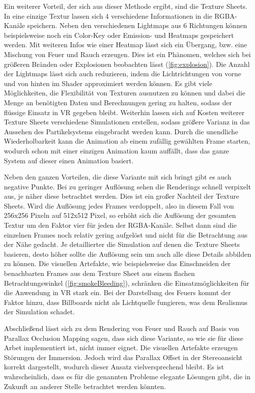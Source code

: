 Ein weiterer Vorteil, der sich aus dieser Methode ergibt, sind die Texture Sheets. In eine einzige Textur lassen sich 4 verschiedene Informationen in die
RGBA-Kanäle speichern. Neben den verschiedenen Lightmaps aus 6 Richtungen können beispielsweise noch ein Color-Key oder Emission- und Heatmaps gespeichert werden.
Mit weiteren Infos wie einer Heatmap lässt sich ein Übergang, bzw. eine Mischung von Feuer und Rauch erzeugen. Dies ist ein Phänomen, welches sich bei größeren Bränden
oder Explosionen beobachten lässt (\autoref{fig:explosion}).
Die Anzahl der Lightmaps lässt sich auch reduzieren, indem die Lichtrichtungen von vorne und von hinten im Shader approximiert werden können.
Es gibt viele Möglichkeiten, die Flexibilität von Texturen ausnutzen zu können und dabei die Menge an benötigten Daten und Berechnungen gering zu halten,
sodass der flüssige Einsatz in VR gegeben bleibt. Weiterhin lassen sich auf Kosten weiterer Texture Sheets
verschiedene Simulationen erstellen, sodass größere Varianz in das Aussehen des Partikelsystems eingebracht werden kann.
Durch die unendliche Wiederholbarkeit kann die Animation ab einem zufällig gewählten Frame starten, wodurch schon mit einer einzigen Animation
kaum auffällt, dass das ganze System auf dieser einen Animation basiert.


Neben den ganzen Vorteilen, die diese Variante mit sich bringt gibt es auch negative Punkte. Bei zu geringer Auflösung sehen die Renderings schnell
verpixelt aus, je näher diese betrachtet werden. Dies ist ein großer Nachteil der Texture Sheets. Wird die Auflösung jedes Frames verdoppelt, also in diesem
Fall von 256x256 Pixeln auf 512x512 Pixel, so erhöht sich die Auflösung der gesamten Textur um den Faktor vier für jeden der RGBA-Kanäle. Selbst dann sind
die einzelnen Frames noch relativ gering aufgelöst und nicht für die Betrachtung aus der Nähe gedacht. Je detaillierter die Simulation auf denen die Texture Sheets basieren,
desto höher sollte die Auflösung sein um auch alle diese Details abbilden zu können.
Die visuellen Artefakte, wie beispielsweise das Einschneiden der benachbarten Frames aus dem Texture Sheet aus einem flachen Betrachtungswinkel (\autoref{fig:smokeBleeding}),
schränken die Einsatzmöglichkeiten für die Anwendung in VR stark ein.
Bei der Darstellung des Feuers kommt der Faktor hinzu, dass Billboards nicht als Lichtquelle fungieren, was dem Realismus der Simulation schadet.

Abschließend lässt sich zu dem Rendering von Feuer und Rauch auf Basis von Parallax Occlusion Mapping sagen, dass sich diese Variante, so wie sie für diese Arbet
implementiert ist, nicht immer eignet. Die visuellen Artefakte erzeugen Störungen der Immersion. Jedoch wird das Parallax Offset in der Stereoansicht korrekt dargestellt,
wodurch dieser Ansatz vielversprechend bleibt. Es ist wahrscheinlich, dass es für die genannten Probleme elegante Lösungen gibt, die in Zukunft an anderer Stelle 
betrachtet werden könnten.



